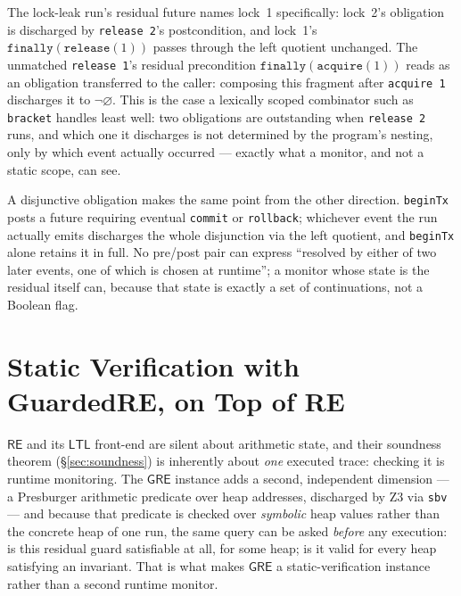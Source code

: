 \documentclass[acmsmall,screen]{acmart}
\newcommand{\RE}{\mathsf{RE}}
\newcommand{\GRE}{\mathsf{GRE}}
\newcommand{\LTL}{\mathsf{LTL}}
\newcommand{\finally}[1]{\mathtt{finally}(#1)}
\newcommand{\univ}{\neg\varnothing}
\begin{document}
\noindent
The lock-leak run's residual future names lock~1 specifically: lock~2's
obligation is discharged by \lstinline{release 2}'s postcondition, and
lock~1's $\finally{\mathtt{release}(1)}$ passes through the left quotient
unchanged.
The unmatched \lstinline{release 1}'s residual precondition
$\finally{\mathtt{acquire}(1)}$ reads as an obligation transferred to the
caller: composing this fragment after \lstinline{acquire 1} discharges it
to $\univ$.
This is the case a lexically scoped combinator such as \lstinline{bracket}
handles least well: two obligations are outstanding when
\lstinline{release 2} runs, and which one it discharges is not determined
by the program's nesting, only by which event actually occurred --- exactly
what a monitor, and not a static scope, can see.

A disjunctive obligation makes the same point from the other direction.
\lstinline{beginTx} posts a future requiring eventual \lstinline{commit} or
\lstinline{rollback}; whichever event the run actually emits discharges the
whole disjunction via the left quotient, and \lstinline{beginTx} alone
retains it in full.
No pre/post pair can express ``resolved by either of two later events, one
of which is chosen at runtime''; a monitor whose state is the residual
itself can, because that state is exactly a set of continuations, not a
Boolean flag.

\section{Static Verification with GuardedRE, on Top of RE}
\label{sec:gre}

$\RE$ and its $\LTL$ front-end are silent about arithmetic state, and their
soundness theorem (\S\ref{sec:soundness}) is inherently about \emph{one}
executed trace: checking it is runtime monitoring.
The $\GRE$ instance adds a second, independent dimension --- a Presburger
arithmetic predicate over heap addresses, discharged by Z3 via
\lstinline{sbv} --- and because that predicate is checked over
\emph{symbolic} heap values rather than the concrete heap of one run, the
same query can be asked \emph{before} any execution: is this residual
guard satisfiable at all, for some heap; is it valid for every heap
satisfying an invariant.
That is what makes $\GRE$ a static-verification instance rather than a
second runtime monitor.
\end{document}
